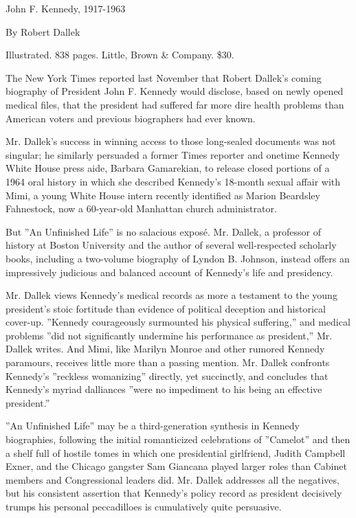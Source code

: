 John F. Kennedy, 1917-1963

By Robert Dallek

Illustrated. 838 pages. Little, Brown \& Company. \$30.

The New York Times reported last November that Robert Dallek's coming
biography of President John F. Kennedy would disclose, based on newly
opened medical files, that the president had suffered far more dire
health problems than American voters and previous biographers had ever
known.

Mr. Dallek's success in winning access to those long-sealed documents
was not singular; he similarly persuaded a former Times reporter and
onetime Kennedy White House press aide, Barbara Gamarekian, to release
closed portions of a 1964 oral history in which she described Kennedy's
18-month sexual affair with Mimi, a young White House intern recently
identified as Marion Beardsley Fahnestock, now a 60-year-old Manhattan
church administrator.

But ''An Unfinished Life'' is no salacious exposé. Mr. Dallek, a
professor of history at Boston University and the author of several
well-respected scholarly books, including a two-volume biography of
Lyndon B. Johnson, instead offers an impressively judicious and balanced
account of Kennedy's life and presidency.

Mr. Dallek views Kennedy's medical records as more a testament to the
young president's stoic fortitude than evidence of political deception
and historical cover-up. ''Kennedy courageously surmounted his physical
suffering,'' and medical problems ''did not significantly undermine his
performance as president,'' Mr. Dallek writes. And Mimi, like Marilyn
Monroe and other rumored Kennedy paramours, receives little more than a
passing mention. Mr. Dallek confronts Kennedy's ''reckless womanizing''
directly, yet succinctly, and concludes that Kennedy's myriad dalliances
''were no impediment to his being an effective president.''

''An Unfinished Life'' may be a third-generation synthesis in Kennedy
biographies, following the initial romanticized celebrations of
''Camelot'' and then a shelf full of hostile tomes in which one
presidential girlfriend, Judith Campbell Exner, and the Chicago gangster
Sam Giancana played larger roles than Cabinet members and Congressional
leaders did. Mr. Dallek addresses all the negatives, but his consistent
assertion that Kennedy's policy record as president decisively trumps
his personal peccadilloes is cumulatively quite persuasive.

